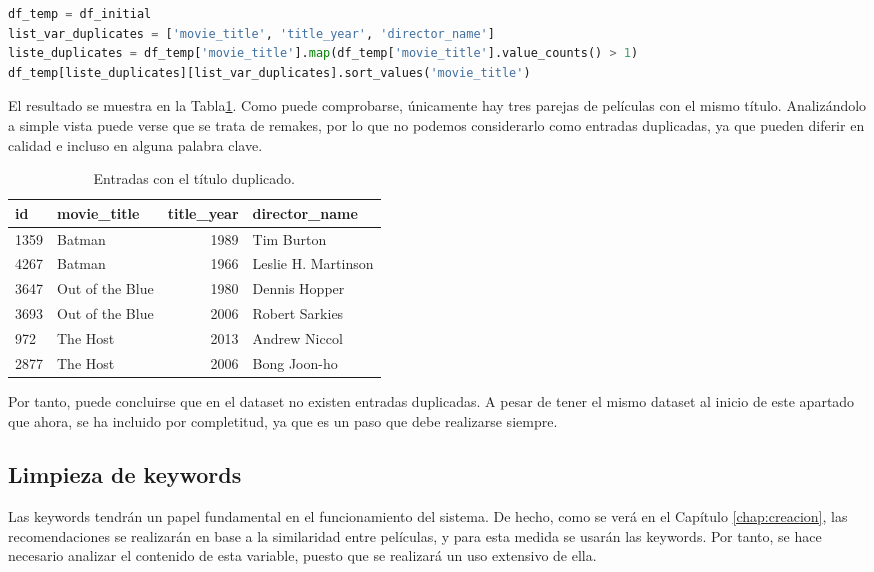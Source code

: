\begin{lstlisting}[language=Python, caption=Entradas con título duplicado.]
df_temp = df_initial
list_var_duplicates = ['movie_title', 'title_year', 'director_name']
liste_duplicates = df_temp['movie_title'].map(df_temp['movie_title'].value_counts() > 1)
df_temp[liste_duplicates][list_var_duplicates].sort_values('movie_title')
\end{lstlisting}

El resultado se muestra en la Tabla\ref{tab:duplicated_entries}. Como puede comprobarse, únicamente hay tres parejas de películas con el mismo título. Analizándolo a simple vista puede verse que se trata de remakes, por lo que no podemos considerarlo como entradas duplicadas, ya que pueden diferir en calidad e incluso en alguna palabra clave.
\begin{table}[h]
\centering
\begin{tabular}{llrl}
\toprule
\textbf{id} &     \textbf{movie\_title} &  \textbf{title\_year} &        \textbf{director\_name} \\
\midrule
1359 &           Batman &      1989 &           Tim Burton \\
4267 &           Batman &      1966 &  Leslie H. Martinson \\
3647 &  Out of the Blue &      1980 &        Dennis Hopper \\
3693 &  Out of the Blue &      2006 &       Robert Sarkies \\
972  &         The Host &      2013 &        Andrew Niccol \\
2877 &         The Host &      2006 &         Bong Joon-ho \\
\bottomrule
\end{tabular}
\caption{Entradas con el título duplicado.}
\label{tab:duplicated_entries}
\end{table}

Por tanto, puede concluirse que en el dataset no existen entradas duplicadas. A pesar de tener el mismo dataset al inicio de este apartado que ahora, se ha incluido por completitud, ya que es un paso que debe realizarse siempre.

\subsection{Limpieza de keywords}

Las keywords tendrán un papel fundamental en el funcionamiento del sistema. De hecho, como se verá en el Capítulo \ref{chap:creacion}, las recomendaciones se realizarán en base a la similaridad entre películas, y para esta medida se usarán las keywords. Por tanto, se hace necesario analizar el contenido de esta variable, puesto que se realizará un uso extensivo de ella.\\

